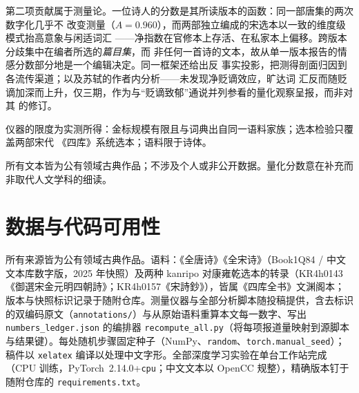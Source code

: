 \documentclass[11pt]{article}
\begin{document}
第二项贡献属于测量论。一位诗人的分数是其所读版本的函数：同一部唐集的两次数字化几乎不
改变测量（$A{=}0.960$），而两部独立编成的宋选本以一致的维度级模式抬高意象与闲适词汇
——净指数在官修本上存活、在私家本上偏移。跨版本分歧集中在编者所选的\emph{篇目集}，而
非任何一首诗的文本，故从单一版本报告的情感分数部分地是一个编辑决定。同一框架还给出反
事实投影，把测得剖面归因到各流传渠道；以及苏轼的作者内分析——未发现净贬谪效应，旷达词
汇反而随贬谪加深而上升，仅三期，作为与“贬谪致郁”通说并列参看的量化观察呈报，而非对其
的修订。

仪器的限度为实测所得：金标规模有限且与词典出自同一语料家族；选本检验只覆盖两部宋代
《四库》系统选本；语料限于诗体。


所有文本皆为公有领域古典作品；不涉及个人或非公开数据。量化分数意在补充而非取代人文学科的细读。

\section*{数据与代码可用性}
\label{sec:repro}
所有来源皆为公有领域古典作品。语料：《全唐诗》《全宋诗》（Book1Q84 / 中文文本库数字版，2025 年快照）及两种 kanripo 对康雍乾选本的转录（KR4h0143《御選宋金元明四朝詩》\citep{kangxi1709}；KR4h0157《宋詩鈔》\citep{wu1671}），皆属《四库全书》文渊阁本；版本与快照标识记录于随附仓库。测量仪器与全部分析脚本随投稿提供，含去标识的双编码原文（\texttt{annotations/}）与从原始语料重算本文每一数字、写出 \texttt{numbers\_ledger.json} 的编排器 \texttt{recompute\_all.py}（将每项报道量映射到源脚本与结果键）。每处随机步骤固定种子（NumPy、\texttt{random}、\texttt{torch.manual\_seed}）；稿件以 \texttt{xelatex} 编译以处理中文字形。全部深度学习实验在单台工作站完成（CPU 训练，PyTorch~2.14.0+\texttt{cpu}；中文文本以 OpenCC 规整），精确版本钉于随附仓库的 \texttt{requirements.txt}。
\end{document}
